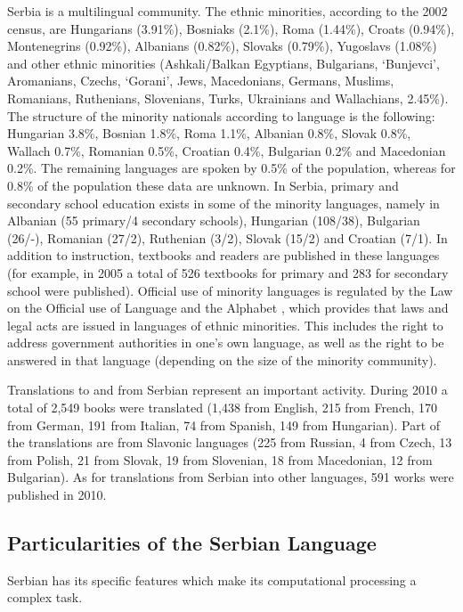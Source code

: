 \begin{multicols}{2}
Serbia is a multilingual community. The ethnic minorities, \cite{Ombudsman} according to the 2002 census, are Hungarians (3.91\%), Bosniaks (2.1\%), Roma (1.44\%), Croats (0.94\%), Montenegrins (0.92\%), Albanians (0.82\%), Slovaks (0.79\%), Yugoslavs (1.08\%) and other ethnic minorities (Ashkali/Balkan Egyptians, Bulgarians, ‘Bunjevci’, Aromanians, Czechs, ‘Gorani’, Jews, Macedonians, Germans, Muslims, Romanians, Ruthenians, Slovenians, Turks, Ukrainians and Wallachians, 2.45\%).  The structure of the minority nationals according to language is the following: Hungarian 3.8\%,  Bosnian 1.8\%,  Roma 1.1\%,  Albanian 0.8\%,  Slovak 0.8\%, Wallach 0.7\%, Romanian 0.5\%,  Croatian 0.4\%,  Bulgarian 0.2\% and Macedonian 0.2\%.  The remaining languages are spoken by 0.5\% of the population, whereas for 0.8\% of the population these data are unknown. In Serbia, primary and secondary school education exists in some of the minority languages, namely in Albanian (55 primary/4 secondary schools), Hungarian (108/38), Bulgarian (26/-), Romanian (27/2), Ruthenian (3/2), Slovak (15/2) and Croatian (7/1). \cite{GOD2010} In addition to instruction, textbooks and readers are published in these languages (for example, in 2005 a total of 526 textbooks for primary and 283 for secondary school were published). \cite{HDR} Official use of minority languages is regulated by the Law on the Official use of Language and the Alphabet \cite{SGRS},  which provides that laws and legal acts are issued in languages of ethnic minorities. This includes the right to address government authorities in one’s own language, as well as the right to be answered in that language (depending on the size of the minority community).

Translations to and from Serbian represent an important activity. During 2010 a total of 2,549 books were translated (1,438 from English, 215 from French, 170 from German, 191 from Italian, 74 from Spanish, 149 from Hungarian). Part of the translations are from Slavonic languages (225 from Russian, 4 from Czech, 13 from Polish, 21 from Slovak, 19 from Slovenian, 18 from Macedonian, 12 from Bulgarian). As for translations from Serbian into other languages, 591 works were published in 2010. 

\subsection{Particularities of the Serbian Language}

Serbian has its specific features which make its computational processing a complex task. 


\end{multicols}
